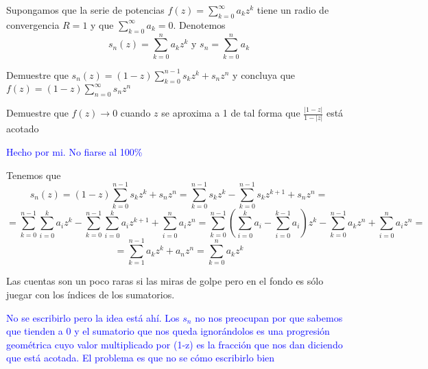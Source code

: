 \begin{problem}[20]
Supongamos que la serie de potencias $f(z)=\sum_{k=0}^{\infty}a_kz^k$ tiene un radio de convergencia $R=1$ y que $\sum_{k=0}^{\infty}a_k=0$. Denotemos
\[s_n(z)=\sum_{k=0}^n a_k z^k \text{  y  } s_n=\sum_{k=0}^na_k\]

\ppart Demuestre que $s_n(z)=(1-z)\sum_{k=0}^{n-1}s_kz^k+s_nz^n$ y concluya que $f(z)=(1-z)\sum_{n=0}^{\infty}s_nz^n$

\ppart Demuestre que $f(z) \to 0$ cuando $z$ se aproxima a 1 de tal forma que $\frac{|1-z|}{1-|z|}$ está acotado

\solution
\textcolor{blue}{Hecho por mi. No fiarse al 100\%}

\spart
Tenemos que
\[s_n(z) = (1-z)\sum_{k=0}^{n-1}s_kz^k+s_nz^n = \sum_{k=0}^{n-1}s_kz^k -\sum_{k=0}^{n-1}s_kz^{k+1}+s_nz^n = \]
\[=\sum_{k=0}^{n-1}\sum_{i=0}^ka_iz^k -\sum_{k=0}^{n-1}\sum_{i=0}^ka_iz^{k+1}+\sum_{i=0}^na_iz^n = \sum_{k=0}^{n-1} \left( \sum_{i=0}^k a_i - \sum_{i=0}^{k-1} a_i\right) z^k - \sum_{k=0}^{n-1} a_kz^n + \sum_{i=0}^na_iz^n =\]
\[= \sum_{k=1}^{n-1} a_k z^k + a_nz^n = \sum_{k=0}^n a_k z^k\]

Las cuentas son un poco raras si las miras de golpe pero en el fondo es sólo juegar con los índices de los sumatorios.

\spart

\textcolor{blue}{No se escribirlo pero la idea está ahí. Los $s_n$ no nos preocupan por que sabemos que tienden a 0 y el sumatorio que nos queda ignorándolos es una progresión geométrica cuyo valor multiplicado por (1-z) es la fracción que nos dan diciendo que está acotada. El problema es que no se cómo escribirlo bien}

\end{problem}

